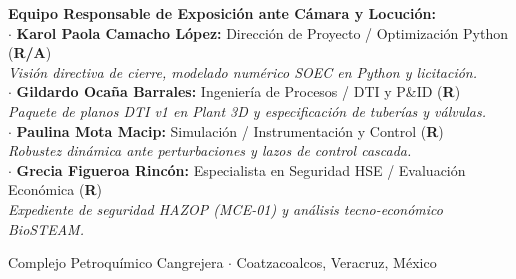 \documentclass[11pt,letterpaper]{article}
\begin{document}
\begin{center}
    \begin{minipage}{0.92\linewidth}
        \textbf{Equipo Responsable de Exposici\'on ante C\'amara y Locuci\'on:}\\
        $\cdot$ \textbf{Karol Paola Camacho L\'opez:} Direcci\'on de Proyecto / Optimizaci\'on Python (\textbf{R/A})\\
        \hspace*{1.5em}\textit{Visi\'on directiva de cierre, modelado num\'erico SOEC en Python y licitaci\'on.}\\
        $\cdot$ \textbf{Gildardo Oca\~na Barrales:} Ingenier\'ia de Procesos / DTI y P\&ID (\textbf{R})\\
        \hspace*{1.5em}\textit{Paquete de planos DTI v1 en Plant 3D y especificaci\'on de tuber\'ias y v\'alvulas.}\\
        $\cdot$ \textbf{Paulina Mota Macip:} Simulaci\'on / Instrumentaci\'on y Control (\textbf{R})\\
        \hspace*{1.5em}\textit{Robustez din\'amica ante perturbaciones y lazos de control cascada.}\\
        $\cdot$ \textbf{Grecia Figueroa Rinc\'on:} Especialista en Seguridad HSE / Evaluaci\'on Econ\'omica (\textbf{R})\\
        \hspace*{1.5em}\textit{Expediente de seguridad HAZOP (MCE-01) y an\'alisis tecno-econ\'omico BioSTEAM.}
    \end{minipage}
    \vfill
    {\small Complejo Petroqu\'imico Cangrejera $\cdot$ Coatzacoalcos, Veracruz, M\'exico}
\end{center}
\end{document}
